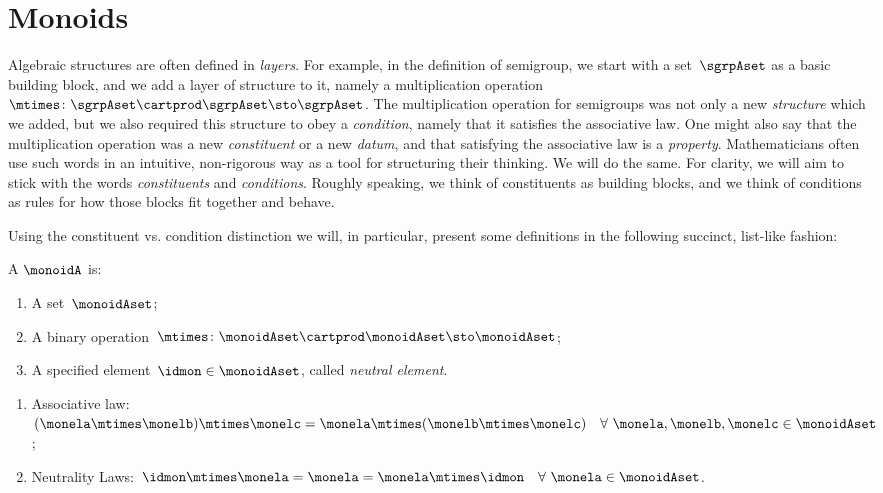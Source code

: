 

\section{Monoids}
\label{sec:parallelism-monoids}

Algebraic structures are often defined in \emph{layers}.
For example, in the definition of semigroup, we start with a set~$\sgrpAset$ as a basic building block, and we add a layer of structure to it, namely a multiplication operation~$\mtimes \colon \sgrpAset \cartprod \sgrpAset \sto \sgrpAset$.
The multiplication operation for semigroups was not only a new \emph{structure} which we added, but we also required this structure to obey a \emph{condition}, namely that it satisfies the associative law.
One might also say that the multiplication operation was a new \emph{constituent} or a new \emph{datum}, and that satisfying the associative law is a \emph{property}.
Mathematicians often use such words in an intuitive, non-rigorous way as a tool for structuring their thinking.
We will do the same.
For clarity, we will aim to stick with the words \emph{constituents} and \emph{conditions}.
Roughly speaking, we think of constituents as building blocks, and we think of conditions as rules for how those blocks fit together and behave.

Using the constituent vs. condition distinction we will, in particular, present some definitions in the following succinct, list-like fashion:

\begin{ctdefinition}[Monoid]
    \label{def:monoid}
    A \emph{}  $\monoidA$  is:
    \begin{body}
        \constit
        \begin{enumerate}
            \item A set~$\monoidAset$;
            \item A binary operation~$\mtimes  \colon \monoidAset \cartprod \monoidAset \sto \monoidAset$;
            \item A specified element~$\idmon \in \monoidAset$, called \emph{neutral element}.
        \end{enumerate}
        \condit
        \begin{enumerate}
            \item Associative law:~$(\monela\mtimes  \monelb)\mtimes  \monelc=
            \monela\mtimes  (\monelb\mtimes  \monelc) \quad  \forall \  \monela, \monelb, \monelc \in \monoidAset$;
            \item Neutrality Laws:~$\idmon\mtimes \monela=\monela=\monela\mtimes  \idmon \quad  \forall \ \monela \in \monoidAset $.
        \end{enumerate}
    \end{body}
\end{ctdefinition}



